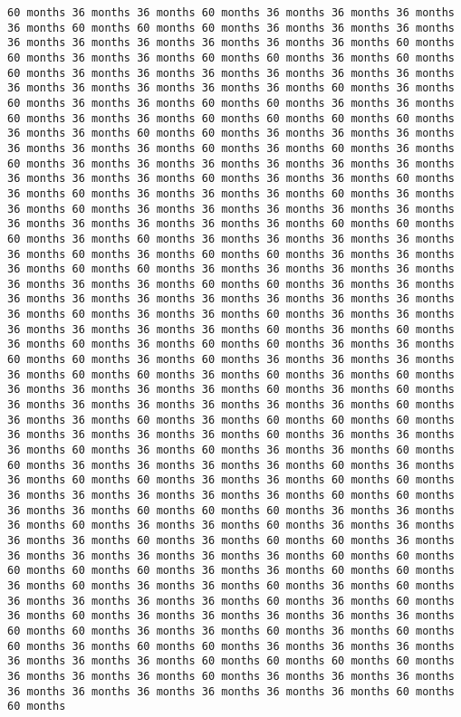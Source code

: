 \documentclass[11pt]{article}
\begin{document}
\begin{Verbatim}[commandchars=\\\{\}, frame=single, framerule=2mm, rulecolor=\color{outerrorbackground}]
60 months 36 months 36 months 60 months 36 months 36 months 36 months 36 months 60 months 60 months 60 months 36 months 36 months 36 months 36 months 36 months 36 months 36 months 36 months 36 months 60 months 60 months 36 months 36 months 60 months 60 months 36 months 60 months 60 months 36 months 36 months 36 months 36 months 36 months 36 months 36 months 36 months 36 months 36 months 36 months 60 months 36 months 60 months 36 months 36 months 60 months 60 months 36 months 36 months 60 months 36 months 36 months 60 months 60 months 60 months 60 months 36 months 36 months 60 months 60 months 36 months 36 months 36 months 36 months 36 months 36 months 60 months 36 months 60 months 36 months 60 months 36 months 36 months 36 months 36 months 36 months 36 months 36 months 36 months 36 months 60 months 36 months 36 months 60 months 36 months 60 months 36 months 36 months 36 months 60 months 36 months 36 months 60 months 36 months 36 months 36 months 36 months 36 months 36 months 36 months 36 months 36 months 36 months 60 months 60 months 60 months 36 months 60 months 36 months 36 months 36 months 36 months 36 months 60 months 36 months 60 months 60 months 36 months 36 months 36 months 60 months 60 months 36 months 36 months 36 months 36 months 36 months 36 months 36 months 60 months 60 months 36 months 36 months 36 months 36 months 36 months 36 months 36 months 36 months 36 months 36 months 60 months 36 months 36 months 60 months 36 months 36 months 36 months 36 months 36 months 36 months 60 months 36 months 60 months 36 months 60 months 36 months 60 months 60 months 36 months 36 months 60 months 60 months 36 months 60 months 36 months 36 months 36 months 36 months 60 months 60 months 36 months 60 months 36 months 60 months 36 months 36 months 36 months 36 months 60 months 36 months 60 months 36 months 36 months 36 months 36 months 36 months 36 months 60 months 36 months 36 months 60 months 36 months 60 months 60 months 60 months 36 months 36 months 36 months 36 months 60 months 36 months 36 months 36 months 60 months 36 months 60 months 36 months 36 months 60 months 60 months 36 months 36 months 36 months 36 months 60 months 36 months 36 months 60 months 60 months 36 months 36 months 60 months 60 months 36 months 36 months 36 months 36 months 36 months 60 months 60 months 36 months 36 months 60 months 60 months 60 months 36 months 36 months 36 months 60 months 36 months 36 months 60 months 36 months 36 months 36 months 36 months 60 months 36 months 60 months 60 months 36 months 36 months 36 months 36 months 36 months 36 months 60 months 60 months 60 months 60 months 60 months 36 months 36 months 60 months 60 months 36 months 60 months 36 months 36 months 60 months 36 months 60 months 36 months 36 months 36 months 36 months 60 months 36 months 60 months 36 months 60 months 36 months 36 months 36 months 36 months 36 months 60 months 60 months 36 months 36 months 60 months 36 months 60 months 60 months 36 months 60 months 60 months 36 months 36 months 36 months 36 months 36 months 36 months 60 months 60 months 60 months 60 months 36 months 36 months 36 months 60 months 36 months 36 months 36 months 36 months 36 months 36 months 36 months 36 months 36 months 60 months 60 months 
\end{Verbatim}
\end{document}
